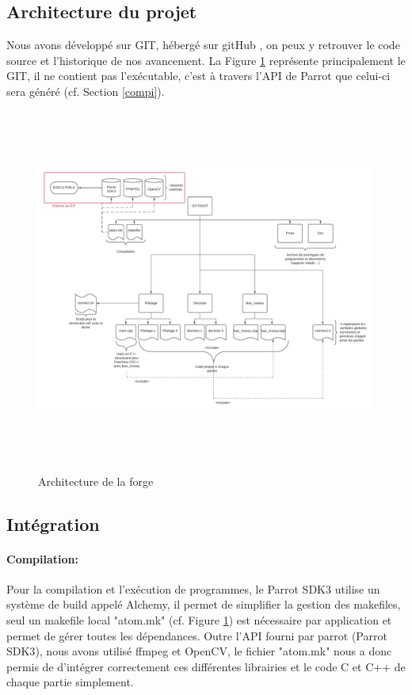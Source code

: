 \documentclass[12pt]{article}
\begin{document}
\subsection{Architecture du projet}
Nous avons développé sur GIT, hébergé sur gitHub\cite{github} , on peux y retrouver le code source\cite{git} et l'historique de nos avancement. La Figure \ref{fig:archi} représente principalement le GIT, il ne contient pas l'exécutable, c'est à travers l'API de Parrot que celui-ci sera généré (cf. Section \ref{compi}).
\begin{figure}[H]
\centering
\includegraphics[height=12cm]{Architecture projet (1).png}
\caption{Architecture de la forge}
\label{fig:archi}
\end{figure}
\subsection{Intégration\label{inte}}
\paragraph*{Compilation:\label{compi}}
Pour la compilation et l'exécution de programmes, le Parrot SDK3\cite{SDK} utilise un système de build appelé Alchemy\cite{alchemy}, il permet de simplifier la gestion des makefiles, seul un makefile local "atom.mk" (cf. Figure \ref{fig:archi}) est nécessaire par application et permet de gérer toutes les dépendances. Outre l'API fourni par parrot (Parrot SDK3\cite{SDK}), nous avons utilisé ffmpeg\cite{FFMPEG} et OpenCV\cite{OpenCV}, le fichier "atom.mk" nous a donc permis de d'intégrer correctement ces différentes librairies et le code C et C++ de chaque partie simplement.
\end{document}
